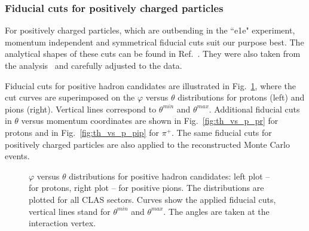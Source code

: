 \subsubsection{Fiducial cuts for positively charged particles}
\label{Sect:fiduc_pos}

For positively charged particles, which are outbending in the ``e1e" experiment, momentum independent and symmetrical fiducial cuts suit our purpose best. The analytical shapes of these cuts can be found in Ref.~\cite{my_an_note:2020}. They were also taken from the analysis~\cite{Fed_an_note:2017} and carefully adjusted to the data. %


Fiducial cuts for positive hadron candidates are illustrated in Fig.~\ref{fig:fiduch_pos_2d}, where the cut curves are superimposed on the $\varphi$ versus $\theta$ distributions for protons (left) and pions (right). Vertical lines correspond to $\theta^{min}$ and $\theta^{max}$. Additional fiducial cuts in $\theta$ versus momentum coordinates are shown in Fig.~\ref{fig:th_vs_p_pr} for protons and in Fig.~\ref{fig:th_vs_p_pip} for $\pi^{+}$. The same fiducial cuts for positively charged particles are also applied to the reconstructed Monte Carlo events.
\begin{figure}[!ht]
\begin{center}
\end{center}
\caption{\small $\varphi$ versus $\theta$ distributions for positive hadron candidates: left plot -- for protons, right plot -- for positive pions. The distributions are plotted for all CLAS sectors. Curves show the applied fiducial cuts, vertical lines stand for $\theta^{min}$ and $\theta^{max}$. The angles are taken at the interaction vertex.}
\label{fig:fiduch_pos_2d}
\end{figure}


